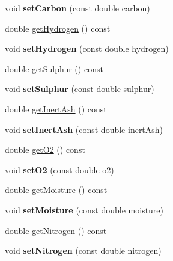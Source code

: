 \begin{DoxyCompactItemize}
void {\bfseries set\+Carbon} (const double carbon)
\item 
double \hyperlink{class_solid_liquid_flue_gas_material_a26af2edd53c50b071648d03bc6442fb6}{get\+Hydrogen} () const
\item 
\mbox{\label{class_solid_liquid_flue_gas_material_a44788e445519bb719a8ff9ca04702e21}} 
void {\bfseries set\+Hydrogen} (const double hydrogen)
\item 
double \hyperlink{class_solid_liquid_flue_gas_material_abe35d8ff283bfa5aadcf00f9906025ae}{get\+Sulphur} () const
\item 
\mbox{\label{class_solid_liquid_flue_gas_material_a34e4eaeb424bcf02dc29a5ab98172ef5}} 
void {\bfseries set\+Sulphur} (const double sulphur)
\item 
double \hyperlink{class_solid_liquid_flue_gas_material_a0549b32b7b5423267d5f59cc96b98127}{get\+Inert\+Ash} () const
\item 
\mbox{\label{class_solid_liquid_flue_gas_material_a75a066ed50d810d5699fd53cb4376dc8}} 
void {\bfseries set\+Inert\+Ash} (const double inert\+Ash)
\item 
double \hyperlink{class_solid_liquid_flue_gas_material_a08d588e576f605d3f9925cb649e1105e}{get\+O2} () const
\item 
\mbox{\label{class_solid_liquid_flue_gas_material_afb57fdbeeccdb58fffec6d6446891409}} 
void {\bfseries set\+O2} (const double o2)
\item 
double \hyperlink{class_solid_liquid_flue_gas_material_accf3c8be942d0ba244f6eabab6e7012b}{get\+Moisture} () const
\item 
\mbox{\label{class_solid_liquid_flue_gas_material_ac811fd9fee43bc497dc53c1e55c17fea}} 
void {\bfseries set\+Moisture} (const double moisture)
\item 
double \hyperlink{class_solid_liquid_flue_gas_material_a76159a5d9d609f0e0131f7bca3b60ebc}{get\+Nitrogen} () const
\item 
\mbox{\label{class_solid_liquid_flue_gas_material_a7082dd41a06397a8ae714096c091bfbe}} 
void {\bfseries set\+Nitrogen} (const double nitrogen)

\end{DoxyCompactItemize}
